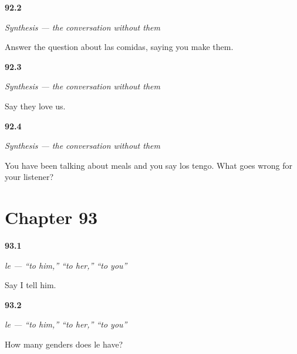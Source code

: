 \noindent\begin{minipage}[t]{\linewidth}
\raggedright
\hypertarget{review-ES-C45-sintesis-sin-repetir-meals}{\textbf{92.2}} \emph{Synthesis — the conversation without them}\par
\small Answer the question about las comidas, saying you make them.
\end{minipage}\par\medskip

\noindent\begin{minipage}[t]{\linewidth}
\raggedright
\hypertarget{review-ES-C45-sintesis-sin-repetir-us}{\textbf{92.3}} \emph{Synthesis — the conversation without them}\par
\small Say they love us.
\end{minipage}\par\medskip

\noindent\begin{minipage}[t]{\linewidth}
\raggedright
\hypertarget{review-ES-C45-sintesis-sin-repetir-cost}{\textbf{92.4}} \emph{Synthesis — the conversation without them}\par
\small You have been talking about meals and you say los tengo. What goes wrong for your listener?
\end{minipage}\par\medskip

\section*{Chapter 93}

\noindent\begin{minipage}[t]{\linewidth}
\raggedright
\hypertarget{review-ES-C46-le-say}{\textbf{93.1}} \emph{le — \textquotedblleft{}to him,\textquotedblright{} \textquotedblleft{}to her,\textquotedblright{} \textquotedblleft{}to you\textquotedblright{}}\par
\small Say I tell him.
\end{minipage}\par\medskip

\noindent\begin{minipage}[t]{\linewidth}
\raggedright
\hypertarget{review-ES-C46-le-gender}{\textbf{93.2}} \emph{le — \textquotedblleft{}to him,\textquotedblright{} \textquotedblleft{}to her,\textquotedblright{} \textquotedblleft{}to you\textquotedblright{}}\par
\small How many genders does le have?
\end{minipage}\par\medskip

